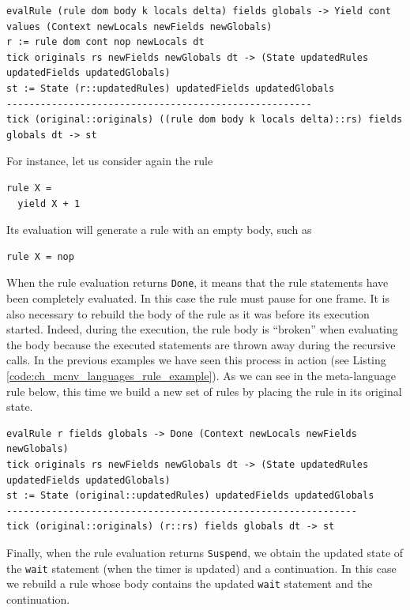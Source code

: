 \begin{lstlisting}
evalRule (rule dom body k locals delta) fields globals -> Yield cont values (Context newLocals newFields newGlobals)
r := rule dom cont nop newLocals dt
tick originals rs newFields newGlobals dt -> (State updatedRules updatedFields updatedGlobals)
st := State (r::updatedRules) updatedFields updatedGlobals
------------------------------------------------------
tick (original::originals) ((rule dom body k locals delta)::rs) fields globals dt -> st
\end{lstlisting}

For instance, let us consider again the rule

\begin{lstlisting}
rule X =
  yield X + 1
\end{lstlisting}

\noindent
Its evaluation will generate a rule with an empty body, such as

\begin{lstlisting}
rule X = nop
\end{lstlisting}

\noindent
When the rule evaluation returns \texttt{Done}, it means that the rule statements have been completely evaluated. In this case the rule must pause for one frame. It is also necessary to rebuild the body of the rule as it was before its execution started. Indeed, during the execution, the rule body is ``broken'' when evaluating the body because the executed statements are thrown away during the recursive calls. In the previous examples we have seen this process in action (see Listing \ref{code:ch_mcnv_languages_rule_example}). As we can see in the meta-language rule below, this time we build a new set of rules by placing the rule in its original state.

\begin{lstlisting}
evalRule r fields globals -> Done (Context newLocals newFields newGlobals)
tick originals rs newFields newGlobals dt -> (State updatedRules updatedFields updatedGlobals)
st := State (original::updatedRules) updatedFields updatedGlobals
--------------------------------------------------------------
tick (original::originals) (r::rs) fields globals dt -> st
\end{lstlisting}

\noindent
Finally, when the rule evaluation returns \texttt{Suspend}, we obtain the updated state of the \texttt{wait} statement (when the timer is updated) and a continuation. In this case we rebuild a rule whose body contains the updated \texttt{wait} statement and the continuation. 

